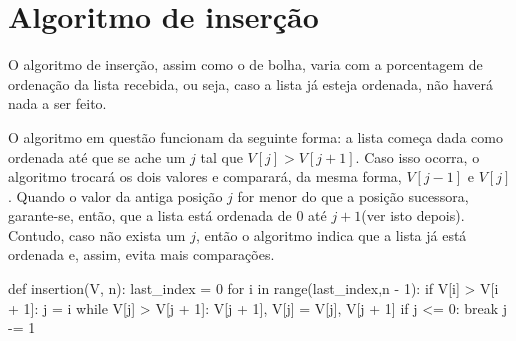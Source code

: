 \section{Algoritmo de inserção}
O algoritmo de inserção, assim como o de bolha, varia com a porcentagem de ordenação da lista recebida, ou seja, caso a lista já esteja ordenada, não haverá nada a ser feito. 


O algoritmo em questão funcionam da seguinte forma: a lista começa dada como ordenada até que se ache um $j$ tal que $V[j]>V[j+1]$. Caso isso ocorra, o algoritmo trocará os dois valores e comparará, da mesma forma, $V[j-1]$ e $V[j]$. Quando o valor da antiga posição $j$ for menor do que a posição sucessora, garante-se, então, que a lista está ordenada de 0 até $j+1$(ver isto depois). Contudo, caso não exista um $j$, então o algoritmo indica que a lista já está ordenada e, assim, evita mais comparações.
\\

\begin{python}
def insertion(V, n):
last_index = 0
for i in range(last_index,n - 1):
    if V[i] > V[i + 1]:
        j = i
        while V[j] > V[j + 1]:
            V[j + 1], V[j] = V[j], V[j + 1]
            if j <= 0:
                break
            j -= 1
\end{python}
